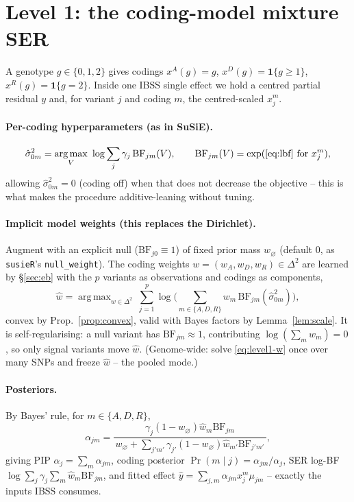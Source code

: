 \documentclass[11pt]{article}
\newcommand{\BF}{\mathrm{BF}}
\newcommand{\simplex}{\Delta}
\DeclareMathOperator*{\argmax}{arg\,max}
\begin{document}
\section{Level 1: the coding-model mixture SER}
\label{sec:level1}
A genotype $g\in\{0,1,2\}$ gives codings $x^A(g)=g$, $x^D(g)=\mathbf1\{g\ge1\}$,
$x^R(g)=\mathbf1\{g=2\}$. Inside one IBSS single effect we hold a centred partial
residual $y$ and, for variant $j$ and coding $m$, the centred-scaled $x_j^m$.

\paragraph{Per-coding hyperparameters (as in SuSiE).}
\begin{equation}
\hat\sigma_{0m}^2=\argmax_{V}\ \log\sum_{j}\gamma_j\,\BF_{jm}(V),
\qquad \BF_{jm}(V)=\exp(\text{\eqref{eq:lbf} for }x_j^m),
\label{eq:level1-V}
\end{equation}
allowing $\hat\sigma_{0m}^2=0$ (coding off) when that does not decrease the
objective -- this is what makes the procedure additive-leaning without tuning.

\paragraph{Implicit model weights (this replaces the Dirichlet).}
Augment with an explicit null ($\BF_{j0}\equiv1$) of fixed prior mass
$w_\varnothing$ (default $0$, as \texttt{susieR}'s \texttt{null\_weight}). The
coding weights $w=(w_A,w_D,w_R)\in\simplex^2$ are learned by \S\ref{sec:eb} with
the $p$ variants as observations and codings as components,
\begin{equation}
\hat w=\argmax_{w\in\simplex^2}\ \sum_{j=1}^{p}\log\Big(\sum_{m\in\{A,D,R\}}
w_m\,\BF_{jm}(\hat\sigma_{0m}^2)\Big),
\label{eq:level1-w}
\end{equation}
convex by Prop.~\ref{prop:convex}, valid with Bayes factors by
Lemma~\ref{lem:scale}. It is self-regularising: a null variant has
$\BF_{jm}\approx1$, contributing $\log(\sum_m w_m)=0$, so only signal variants
move $\hat w$. (Genome-wide: solve \eqref{eq:level1-w} once over many SNPs and
freeze $\hat w$ -- the pooled mode.)

\paragraph{Posteriors.} By Bayes' rule, for $m\in\{A,D,R\}$,
\begin{equation}
\alpha_{jm}
=\frac{\gamma_j(1-w_\varnothing)\hat w_m\BF_{jm}}
{\,w_\varnothing+\sum_{j'm'}\gamma_{j'}(1-w_\varnothing)\hat w_{m'}\BF_{j'm'}\,},
\label{eq:level1-post}
\end{equation}
giving PIP $\alpha_j=\sum_m\alpha_{jm}$, coding posterior
$\Pr(m\mid j)=\alpha_{jm}/\alpha_j$, SER log-BF
$\log\sum_j\gamma_j\sum_m\hat w_m\BF_{jm}$, and fitted effect
$\hat y=\sum_{j,m}\alpha_{jm}x_j^m\mu_{jm}$ -- exactly the inputs IBSS consumes.
\end{document}
